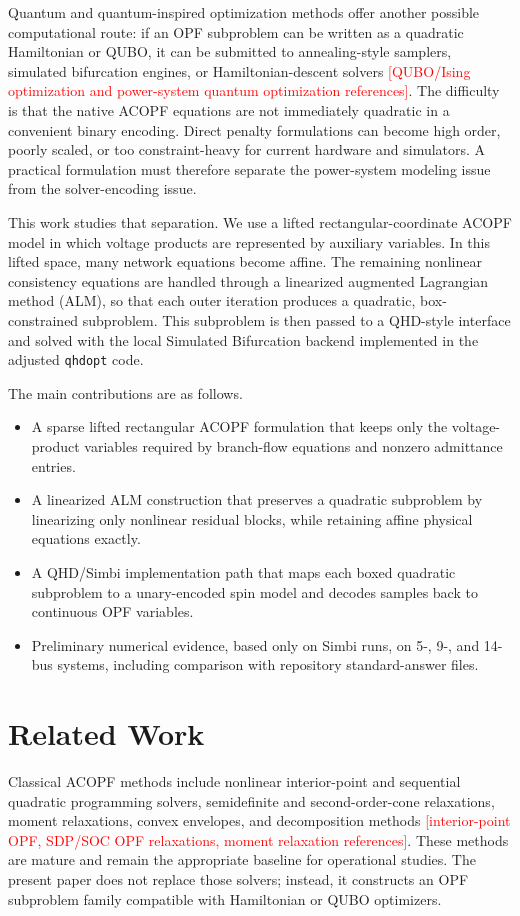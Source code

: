 \documentclass[journal]{IEEEtran}
\newcommand{\needref}[1]{\textcolor{red}{[#1]}}
\begin{document}
Quantum and quantum-inspired optimization methods offer another possible computational route: if an OPF subproblem can be written as a quadratic Hamiltonian or QUBO, it can be submitted to annealing-style samplers, simulated bifurcation engines, or Hamiltonian-descent solvers \needref{QUBO/Ising optimization and power-system quantum optimization references}. The difficulty is that the native ACOPF equations are not immediately quadratic in a convenient binary encoding. Direct penalty formulations can become high order, poorly scaled, or too constraint-heavy for current hardware and simulators. A practical formulation must therefore separate the power-system modeling issue from the solver-encoding issue.

This work studies that separation. We use a lifted rectangular-coordinate ACOPF model in which voltage products are represented by auxiliary variables. In this lifted space, many network equations become affine. The remaining nonlinear consistency equations are handled through a linearized augmented Lagrangian method (ALM), so that each outer iteration produces a quadratic, box-constrained subproblem. This subproblem is then passed to a QHD-style interface and solved with the local Simulated Bifurcation backend implemented in the adjusted \texttt{qhdopt} code.

The main contributions are as follows.
\begin{itemize}
    \item A sparse lifted rectangular ACOPF formulation that keeps only the voltage-product variables required by branch-flow equations and nonzero admittance entries.
    \item A linearized ALM construction that preserves a quadratic subproblem by linearizing only nonlinear residual blocks, while retaining affine physical equations exactly.
    \item A QHD/Simbi implementation path that maps each boxed quadratic subproblem to a unary-encoded spin model and decodes samples back to continuous OPF variables.
    \item Preliminary numerical evidence, based only on Simbi runs, on 5-, 9-, and 14-bus systems, including comparison with repository standard-answer files.
\end{itemize}

\section{Related Work}
Classical ACOPF methods include nonlinear interior-point and sequential quadratic programming solvers, semidefinite and second-order-cone relaxations, moment relaxations, convex envelopes, and decomposition methods \needref{interior-point OPF, SDP/SOC OPF relaxations, moment relaxation references}. These methods are mature and remain the appropriate baseline for operational studies. The present paper does not replace those solvers; instead, it constructs an OPF subproblem family compatible with Hamiltonian or QUBO optimizers.
\end{document}
